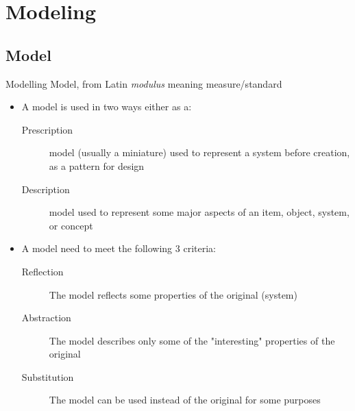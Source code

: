 \documentclass[slidetop,mathserif,red]{beamer}
\begin{document}
\section{Modeling}

\subsection{Model}

\begin{frame}{Modelling}
    Model, from Latin \emph{modulus} meaning measure/standard
    \begin{itemize}
    \item A model is used in two ways either as a:

        \begin{description}
        \item[Prescription] model (usually a miniature) used to represent a system before creation, as a pattern for design

        \item[Description] model used to represent some major aspects of an item, object, system, or concept
        \end{description}

    \item A model need to meet the following 3 criteria:

        \begin{description}
        \item [Reflection ] The model reflects some properties of the original (system)%

        \item [Abstraction] The model describes only some of the "interesting" properties of the original

        \item [Substitution] The model can be used instead of the original for some purposes

        \end{description}
    \end{itemize}

\end{frame}
\end{document}
